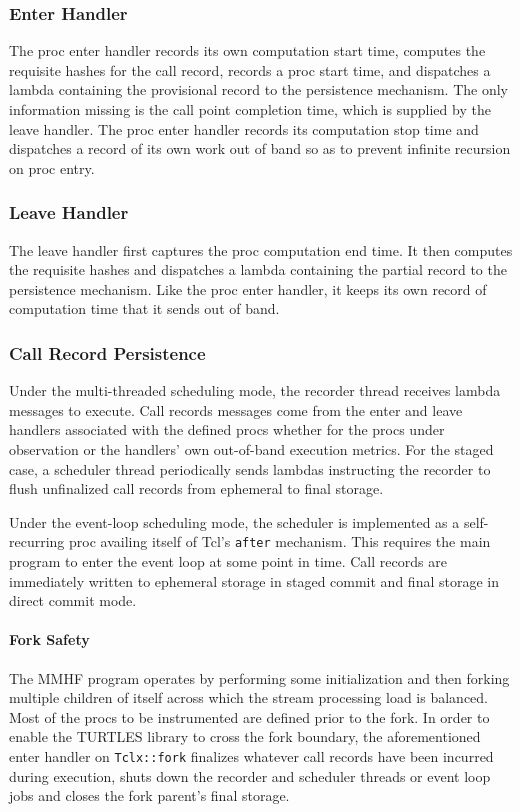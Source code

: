 \documentclass{article}[letter,10pt]
\begin{document}
{{    \subsubsection{Enter Handler}{
      The proc enter handler records its own computation start time, computes the requisite hashes for the call record,
      records a proc start time, and dispatches a lambda containing the provisional record to the persistence mechanism.
      The only information missing is the call point completion time, which is supplied by the leave handler.
      The proc enter handler records its computation stop time and dispatches a record of its own work out of band
      so as to prevent infinite recursion on proc entry.
    }

    \subsubsection{Leave Handler}{
      The leave handler first captures the proc computation end time. It then computes the requisite hashes and
      dispatches a lambda containing the partial record to the persistence mechanism. Like the proc enter handler,
      it keeps its own record of computation time that it sends out of band.
    }
    \subsubsection{Call Record Persistence}{
      Under the multi-threaded scheduling mode, the recorder thread receives lambda messages to execute.
      Call records messages come from the enter and leave handlers associated with the defined procs
      whether for the procs under observation or the handlers' own out-of-band execution metrics.
      For the staged case, a scheduler thread periodically sends lambdas instructing the recorder to
      flush unfinalized call records from ephemeral to final storage.

      Under the event-loop scheduling mode, the scheduler is implemented as a self-recurring proc
      availing itself of Tcl's \texttt{after} mechanism. This requires the main program to enter the
      event loop at some point in time. Call records are immediately written to ephemeral storage
      in staged commit and final storage in direct commit mode.

      \paragraph{Fork Safety}{
        The MMHF program operates by performing some initialization and then forking multiple children of itself
        across which the stream processing load is balanced. Most of the procs to be instrumented are defined
        prior to the fork. In order to enable the TURTLES library to cross the fork boundary, the aforementioned
        enter handler on \texttt{Tclx::fork} finalizes whatever call records have been incurred during execution,
        shuts down the recorder and scheduler threads or event loop jobs and closes the fork parent's final storage.

}}}}
\end{document}
